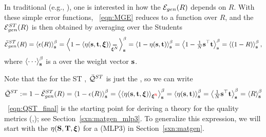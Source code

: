 

In traditional \STATMECH (e.g., \cite{SST92}), one is interested in how the \emph{\TotalModelGeneralizationError} ${\mathcal{E}}_{gen}(R)$ depends on $R$.
With these simple error functions, \EQN~\ref{eqn:MGE} reduces to a function over $R$,
and the \AverageSTGeneralizationError ${\mathcal{E}}^{ST}_{gen}(R)$ is then obtained by averaging over the Students 
\begin{align}
\label{eqn:AVGSTGE_R}
\AVGSTGE(R)=\THRMAVG{\EPSL(R)}=
\THRMAVG{1-\langle\ETA(\SVEC,\TVEC,\XI)\rangle_{\AVGNDXI}}=
\THRMAVG{1-\ETA(\SVEC,\TVEC)}=
\THRMAVG{1-\tfrac{1}{N}\SVEC^{\top}\TVEC}=
\THRMAVG{(1-R)}  ,
\end{align}
where $\THRMAVG{\cdots}$ is a \ThermalAverage over the \Student weight vector ${\mathbf{s}}$.

Note that the \ModelQuality for the ST \Perceptron, $\bar{\mathcal{Q}}^{ST}$
is just the \AverageGeneralizationAccuracy, so we can write
\begin{align}
\label{eqn:lQST_final}
\bar{\mathcal{Q}}^{ST}:=1-\bar{\mathcal{E}}^{ST}_{gen}(R)=\left\langle 1-\epsilon(R) \right\rangle_{\mathbf s}^{\beta}
=\left\langle \langle\eta({\mathbf{s}}, {\mathbf{t}}, \boldsymbol{\xi}) \rangle_{\boldsymbol{\xi}^{{\color{red}\sf{N}}}} \right\rangle_{\mathbf s}^{\beta}
=\left\langle \eta({\mathbf{s}}, {\mathbf{t}}) \right\rangle_{\mathbf s}^{\beta}
=\left\langle \tfrac{1}{N}{\mathbf{s}}^{\top}{\mathbf{t}} \right\rangle_{\mathbf s}^{\beta}=\left\langle R \right\rangle_{\mathbf s}^{\beta}
\end{align}
\EQN~\ref{eqn:QST_final} is the starting point for deriving a \SEMIEMP theory for the \WW quality metrics (\ALPHA,\ALPHAHAT);
see Section~\ref{sxn:matgen_mlp3}.
To generalize this expression, we will start with the \SelfOverlap $\eta({\mathbf{S}},{\mathbf{T}},\boldsymbol{\xi})$ for a
\MultiLayerPerceptron (MLP3) in Section~\ref{sxn:matgen}.

